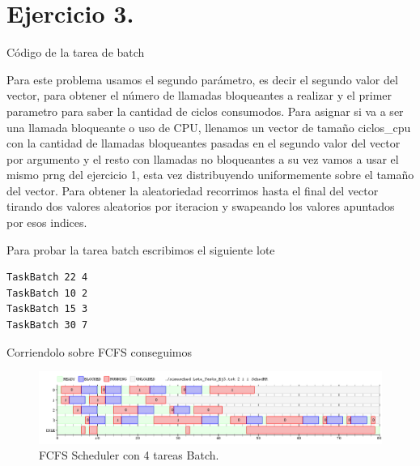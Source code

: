 \section{Ejercicio 3.}

Código de la tarea de batch



Para este problema usamos el segundo parámetro, es decir el segundo valor del vector, para obtener
el número de llamadas bloqueantes a realizar y el primer parametro para saber la cantidad de ciclos
consumodos.
Para asignar si va a ser una llamada bloqueante o uso de CPU, llenamos un vector de tamaño
ciclos\_cpu con la cantidad de
llamadas bloqueantes pasadas en el segundo valor del vector por argumento y el resto con llamadas no
bloqueantes a su vez vamos a usar el mismo prng del ejercicio 1, esta vez distribuyendo uniformemente sobre
el tamaño del vector. Para obtener la aleatoriedad recorrimos hasta el final del vector tirando dos
valores aleatorios por iteracion y swapeando los valores apuntados por esos indices.

Para probar la tarea batch escribimos el siguiente lote

\begin{Verbatim}
TaskBatch 22 4
TaskBatch 10 2
TaskBatch 15 3
TaskBatch 30 7
\end{Verbatim}

Corriendolo sobre FCFS conseguimos

\begin{figure}[h]
    \centerline{\includegraphics[scale=0.55]{images/Ej3}}
    \caption{FCFS Scheduler con 4 tareas Batch.}
\end{figure}

